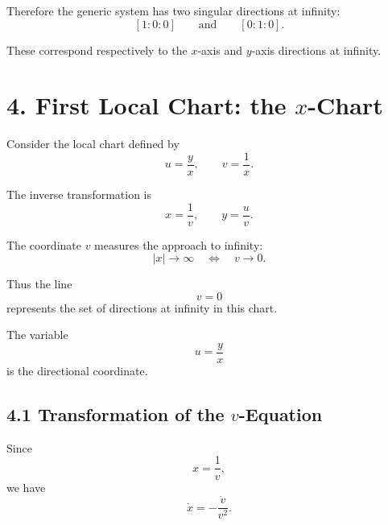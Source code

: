 \documentclass[11pt,a4paper]{article}
\begin{document}
Therefore the generic system has two singular directions at
infinity:
\begin{equation}
\boxed{
[1:0:0]
\qquad\text{and}\qquad
[0:1:0].
}
\tag{10}
\end{equation}

These correspond respectively to the $x$-axis and $y$-axis
directions at infinity.

\section{4. First Local Chart: the $x$-Chart}

Consider the local chart defined by
\begin{equation}
\boxed{
u=\frac{y}{x},
\qquad
v=\frac{1}{x}.
}
\tag{11}
\end{equation}

The inverse transformation is
\begin{equation}
\boxed{
x=\frac{1}{v},
\qquad
y=\frac{u}{v}.
}
\tag{12}
\end{equation}

The coordinate $v$ measures the approach to infinity:
\begin{equation}
|x|\to\infty
\quad\Longleftrightarrow\quad
v\to0.
\end{equation}

Thus the line
\begin{equation}
\boxed{
v=0
}
\tag{13}
\end{equation}
represents the set of directions at infinity in this chart.

The variable
\begin{equation}
u=\frac{y}{x}
\end{equation}
is the directional coordinate.

\subsection{4.1 Transformation of the $v$-Equation}

Since
\begin{equation}
x=\frac{1}{v},
\end{equation}
we have
\begin{equation}
\dot{x}
=
-\frac{\dot v}{v^2}.
\end{equation}
\end{document}
